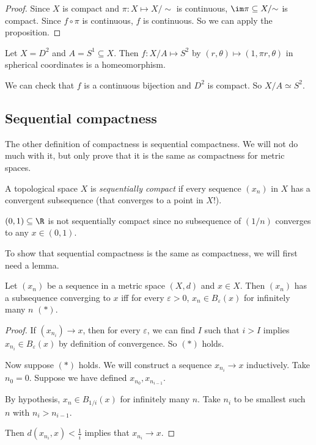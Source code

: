 \documentclass[a4paper]{article}
\begin{document}
\begin{proof}
  Since $X$ is compact and $\pi: X\mapsto X/{\sim}$ is continuous, $\im \pi \subseteq X/{\sim}$ is compact. Since $f\circ \pi$ is continuous, $f$ is continuous. So we can apply the proposition.
\end{proof}

\begin{eg}
  Let $X = D^2$ and $A = S^1 \subseteq X$. Then $f: X/A \mapsto S^2$ by $(r, \theta) \mapsto (1, \pi r, \theta)$ in spherical coordinates is a homeomorphism.

  We can check that $f$ is a continuous bijection and $D^2$ is compact. So $X/A \simeq S^2$.
\end{eg}

\subsection{Sequential compactness}
The other definition of compactness is sequential compactness. We will not do much with it, but only prove that it is the same as compactness for metric spaces.

\begin{defi}
  A topological space $X$ is \emph{sequentially compact} if every sequence $(x_n)$ in $X$ has a convergent subsequence (that converges to a point in $X$!).
\end{defi}

\begin{eg}
  $(0, 1) \subseteq \R$ is not sequentially compact since no subsequence of $(1/n)$ converges to any $x\in (0, 1)$.
\end{eg}

To show that sequential compactness is the same as compactness, we will first need a lemma.
\begin{lemma}
  Let $(x_n)$ be a sequence in a metric space $(X, d)$ and $x\in X$. Then $(x_n)$ has a subsequence converging to $x$ iff for every $\varepsilon > 0$, $x_n \in B_\varepsilon (x)$ for infinitely many $n$ $(*)$.
\end{lemma}

\begin{proof}
  If $(x_{n_i}) \to x$, then for every $\varepsilon$, we can find $I$ such that $i > I$ implies $x_{n_i}\in B_\varepsilon (x)$ by definition of convergence. So $(*)$ holds.

  Now suppose $(*)$ holds. We will construct a sequence $x_{n_i} \to x$ inductively. Take $n_0 = 0$. Suppose we have defined $x_{n_0}, x_{n_{i - 1}}$.

  By hypothesis, $x_n \in B_{1/i}(x)$ for infinitely many $n$. Take $n_i$ to be smallest such $n$ with $n_i > n_{i - 1}$.

  Then $d(x_{n_i}, x) < \frac{1}{i}$ implies that $x_{n_i} \to x$.
\end{proof}
\end{document}
